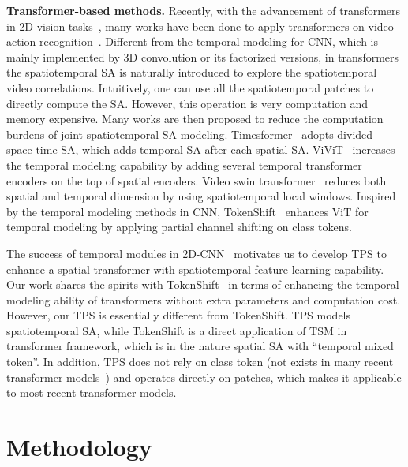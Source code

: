 \documentclass[runningheads]{llncs}
\begin{document}
	
	\textbf{Transformer-based methods.} Recently, with the advancement of transformers in 2D vision tasks~\cite{dosovitskiy2021an,liu2021swin,yuan2021tokens,han2021transformer,touvron2021training,chen2021crossvit}, many works have been done to apply transformers on video action recognition~\cite{GedasBertasius2021IsSA,AnuragArnab2021ViViTAV,ZeLiu2021VideoST,HaoZhang2021TokenST}. Different from the temporal modeling for CNN, which is mainly implemented by 3D convolution or its factorized versions, in transformers the spatiotemporal SA is naturally introduced to explore the spatiotemporal video correlations. Intuitively, one can use all the spatiotemporal patches to directly compute the SA. However, this operation is very computation and memory expensive. Many works are then proposed to reduce the computation burdens of joint spatiotemporal SA modeling. Timesformer~\cite{GedasBertasius2021IsSA} adopts divided space-time SA, which adds temporal SA after each spatial SA. ViViT~\cite{AnuragArnab2021ViViTAV} increases the temporal modeling capability by adding several temporal transformer encoders on the top of spatial encoders. Video swin transformer~\cite{ZeLiu2021VideoST} reduces both spatial and temporal dimension by using spatiotemporal local windows. Inspired by the temporal modeling methods in CNN, TokenShift~\cite{HaoZhang2021TokenST} enhances ViT for temporal modeling by applying partial channel shifting on class tokens.
	
	The success of temporal modules in 2D-CNN~\cite{qiu2017learning,lin2019tsm,liu2020teinet,li2020tea,wang2021tdn} motivates us to develop TPS to enhance a spatial transformer with spatiotemporal feature learning capability. Our work shares the spirits with TokenShift~\cite{HaoZhang2021TokenST} in terms of enhancing the temporal modeling ability of transformers without extra parameters and computation cost. However, our TPS is essentially different from TokenShift. TPS models spatiotemporal SA, while TokenShift is a direct application of TSM in transformer framework, which is in the nature spatial SA with ``temporal mixed token''. In addition, TPS does not rely on class token (not exists in many recent transformer models~\cite{liu2021swin}) and operates directly on patches, which makes it applicable to most recent transformer models.
	
	
	\section{Methodology}
	
\end{document}

